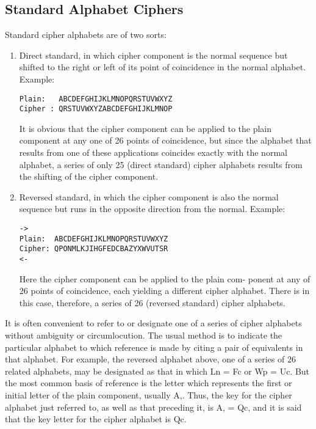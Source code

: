 \subsection{Standard Alphabet Ciphers}

\mypara Standard cipher alphabets are of two sorts:
\begin{enumerate}
\item Direct standard, in which cipher component is the normal
sequence but shifted to the right or left of its point of coincidence in the normal alphabet. Example:

\longrightarrow
\begin{verbatim}
Plain:   ABCDEFGHIJKLMNOPQRSTUVWXYZ
Cipher : QRSTUVWXYZABCDEFGHIJKLMNOP
\end{verbatim}
\longrightarrow

It is obvious that the cipher component can be applied to the
plain component at any one of 26 points of coincidence, but
since the alphabet that results from one of these applications
coincides exactly with the normal alphabet, a series of only
25 (direct standard) cipher alphabets results from the shifting
of the cipher component.

\item Reversed standard, in which the cipher component is also the
normal sequence but runs in the opposite direction from the
normal. Example:

\begin{verbatim}
->
Plain:  ABCDEFGHIJKLMNOPQRSTUVWXYZ
Cipher: QPONMLKJIHGFEDCBAZYXWVUTSR
<-
\end{verbatim}

Here the cipher component can be applied to the plain com-
ponent at any of 26 points of coincidence, each yielding a
different cipher alphabet. There is in this case, therefore, a
series of 26 (reversed standard) cipher alphabets.
\end{enumerate}

\mypara It is often convenient to refer to or designate one of a series of
cipher alphabets without ambiguity or circumlocution. The usual method
is to indicate the particular alphabet to which reference is made by citing
a pair of equivalents in that alphabet. For example, the reversed alphabet
above, one of a series of 26 related alphabets, may be designated as that
in which Ln = Fc or Wp = Uc. But the most common basis of reference is the letter which represents the ﬁrst or initial letter of the plain
component, usually A,. Thus, the key for the cipher alphabet just
referred to, as well as that preceding it, is A, = Qc, and it is said that the
key letter for the cipher alphabet is Qc.

